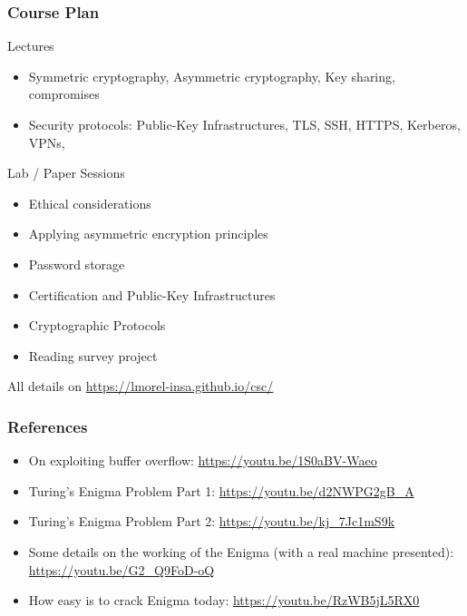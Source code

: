 \documentclass[
hyperref={pdfpagelabels=false}
,xcolor=table
]
{beamer}
\begin{document}
\begin{frame}
  \frametitle{Course Plan}
  
  \begin{block}{Lectures}
    \begin{itemize}
    \item Symmetric cryptography, Asymmetric cryptography, Key sharing, compromises 
    \item Security protocols: Public-Key Infrastructures, TLS, SSH, HTTPS, Kerberos, VPNs, 
    \end{itemize}
  \end{block}

  \begin{block}{Lab / Paper Sessions}
    \begin{itemize}
    \item Ethical considerations
    \item Applying asymmetric encryption principles
    \item Password storage
    \item Certification and Public-Key Infrastructures
    \item Cryptographic Protocols
    \item Reading survey project
    \end{itemize}
  \end{block}

  All details on \url{https://lmorel-insa.github.io/csc/}
  
\end{frame}





\begin{frame}
  \frametitle{References}
  \begin{itemize}
  \item On exploiting buffer overflow: \url{https://youtu.be/1S0aBV-Waeo}
  \item Turing's Enigma Problem Part 1: \url{https://youtu.be/d2NWPG2gB_A}
  \item Turing's Enigma Problem Part 2: \url{https://youtu.be/kj_7Jc1mS9k}
  \item Some details on the working of the Enigma (with a real machine presented): \url{https://youtu.be/G2_Q9FoD-oQ}
  \item How easy is to crack Enigma today: \url{https://youtu.be/RzWB5jL5RX0}
  \end{itemize}
\end{frame}
\end{document}
